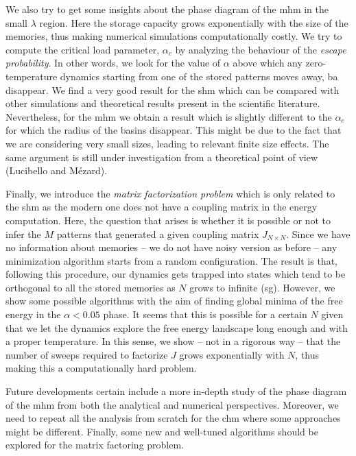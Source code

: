 \documentclass[\rootdir/main.tex]{subfiles}
\begin{document}
We also try to get some insights about the phase diagram of the \acrshort{mhm} in the small $\lambda$ region. Here the storage capacity grows exponentially with the size of the memories, thus making numerical simulations computationally costly. We try to compute the critical load parameter, $\alpha_c$ by analyzing the behaviour of the \emph{escape probability}. In other words, we look for the value of $\alpha$ above which any zero-temperature dynamics starting from one of the stored patterns moves away, \ie \acrshort{ba} disappear.
We find a very good result for the \acrshort{shm} which can be compared with other simulations and theoretical results present in the scientific literature. Nevertheless, for the \acrshort{mhm} we obtain a result which is slightly different to the $\alpha_c$ for which the radius of the basins disappear. This might be due to the fact that we are considering very small sizes, leading to relevant finite size effects. The same argument is still under investigation from a theoretical point of view (Lucibello and Mézard).

Finally, we introduce the \emph{matrix factorization problem} which is only related to the \acrlong{shm} as the modern one does not have a coupling matrix in the energy computation. Here, the question that arises is whether it is possible or not to infer the $M$ patterns that generated a given coupling matrix $J_{N \times N}$.
Since we have no information about memories -- \ie we do not have noisy version as before -- any minimization algorithm starts from a random configuration. The result is that, following this procedure, our dynamics gets trapped into states which tend to be orthogonal to all the stored memories as $N$ grows to infinite (\acrshort{sg}). However, we show some possible algorithms with the aim of finding global minima of the free energy in the $\alpha < 0.05$ phase. It seems that this is possible for a certain $N$ given that we let the dynamics explore the free energy landscape long enough and with a proper temperature. In this sense, we show -- not in a rigorous way -- that the number of sweeps required to factorize $J$ grows exponentially with $N$, thus making this a computationally hard problem.

Future developments certain include a more in-depth study of the phase diagram of the \acrlong{mhm} from both the analytical and numerical perspectives. Moreover, we need to repeat all the analysis from scratch for the \acrlong{chm} where some approaches might be different. Finally, some new and well-tuned algorithms should be explored for the matrix factoring problem.
\end{document}

